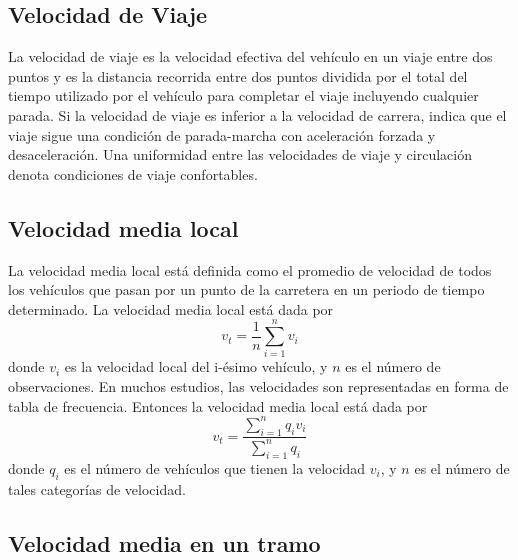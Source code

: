 \subsection{Velocidad de Viaje}

La velocidad de viaje es la velocidad efectiva del vehículo en un viaje entre dos puntos y es la distancia recorrida entre dos puntos dividida por el total del tiempo utilizado por el vehículo para completar el viaje incluyendo cualquier parada. Si la velocidad de viaje es inferior a la velocidad de carrera, indica que el viaje sigue una condición de parada-marcha con aceleración forzada y desaceleración. Una uniformidad entre las velocidades de viaje y circulación denota condiciones de viaje confortables.

\subsection{Velocidad media local}

La velocidad media local está definida como el promedio de velocidad de todos los vehículos que pasan por un punto de la carretera en un periodo de tiempo determinado. La velocidad media local está dada por
\begin{equation}
{ v }_{ t }=\frac { 1 }{ n } \sum _{ i=1 }^{ n }{ { v }_{ i } }
\end{equation}
donde $v_{i}$ es la velocidad local del i-ésimo vehículo, y $n$ es el número de observaciones. En  muchos estudios, las velocidades son representadas en forma de tabla de frecuencia. Entonces la velocidad media local está dada por
\begin{equation}
{ v }_{ t }=\frac { \sum _{ i=1 }^{ n }{ { q }_{ i }{ v }_{ i } }  }{ \sum _{ i=1 }^{ n }{ { q }_{ i } }  } 
\end{equation}
donde $q_{i}$ es el número de vehículos que tienen la velocidad $v_{i}$, y $n$ es el número de tales categorías de velocidad.

\subsection{Velocidad media en un tramo}

